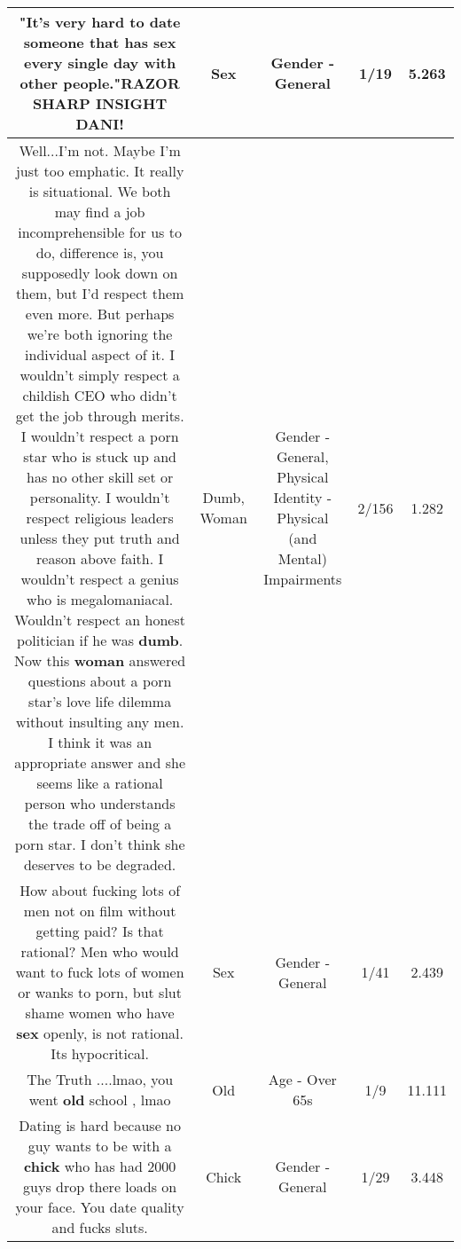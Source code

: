 \documentclass[11pt]{article}
\newlength\mylength
\begin{document}
\begin{center}
\begin{longtable}{|C{.65\mylength}|C{.30\mylength}|C{.12\mylength}|C{.12\mylength}|C{.12\mylength}|}
  \small "It's very hard to date someone that has \textbf{sex} every single day with other people."RAZOR SHARP INSIGHT DANI!\normalsize   & Sex & Gender - General & 1/19 & 5.263 \\  \hline
  \small Well...I'm not. Maybe I'm just too emphatic. It really is situational. We both may find a job incomprehensible for us to do, difference is, you supposedly look down on them, but I'd respect them even more. But perhaps we're both ignoring the individual aspect of it. I wouldn't simply respect a childish CEO who didn't get the job through merits. I wouldn't respect a porn star who is stuck up and has no other skill set or personality. I wouldn't respect religious leaders unless they put truth and reason above faith. I wouldn't respect a genius who is megalomaniacal. Wouldn't respect an honest politician if he was \textbf{dumb}. Now this \textbf{woman} answered questions about a porn star's love life dilemma without insulting any men. I think it was an appropriate answer and she seems like a rational person who understands the trade off of being a porn star. I don't think she deserves to be degraded.\normalsize   & Dumb, Woman & Gender - General, Physical Identity - Physical (and Mental) Impairments & 2/156 & 1.282 \\  \hline
  \small How about fucking lots of men not on film without getting paid? Is that rational? Men who would want to fuck lots of women or wanks to porn, but slut shame women who have \textbf{sex} openly, is not rational. Its hypocritical.\normalsize   & Sex & Gender - General & 1/41 & 2.439 \\  \hline
  \small The Truth ....lmao, you went \textbf{old} school , lmao\normalsize   & Old & Age - Over 65s & 1/9 & 11.111 \\  \hline
  \small Dating is hard because no guy wants to be with a \textbf{chick} who has had 2000 guys drop there loads on your face.  You date quality and fucks sluts.\normalsize   & Chick & Gender - General & 1/29 & 3.448 \\  \hline

\end{longtable}
\end{center}
\end{document}
